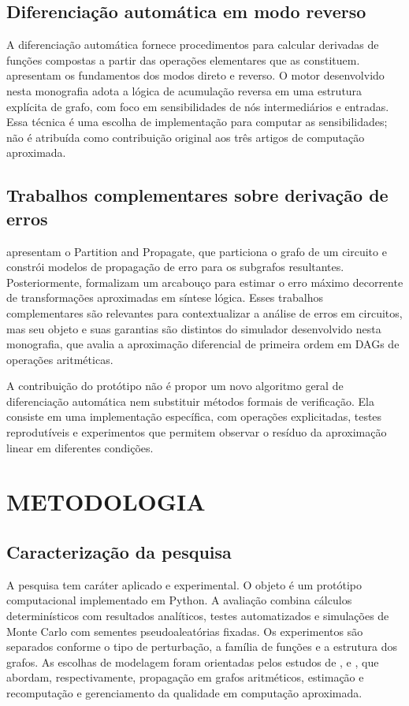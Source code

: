 \documentclass[12pt,openright,oneside,a4paper,brazil]{abntex2}
\begin{document}
\section{Diferenciação automática em modo reverso}
A diferenciação automática fornece procedimentos para calcular derivadas de funções compostas a partir das operações elementares que as constituem.  apresentam os fundamentos dos modos direto e reverso. O motor desenvolvido nesta monografia adota a lógica de acumulação reversa em uma estrutura explícita de grafo, com foco em sensibilidades de nós intermediários e entradas. Essa técnica é uma escolha de implementação para computar as sensibilidades; não é atribuída como contribuição original aos três artigos de computação aproximada.

\section{Trabalhos complementares sobre derivação de erros}
 apresentam o Partition and Propagate, que particiona o grafo de um circuito e constrói modelos de propagação de erro para os subgrafos resultantes. Posteriormente,  formalizam um arcabouço para estimar o erro máximo decorrente de transformações aproximadas em síntese lógica. Esses trabalhos complementares são relevantes para contextualizar a análise de erros em circuitos, mas seu objeto e suas garantias são distintos do simulador desenvolvido nesta monografia, que avalia a aproximação diferencial de primeira ordem em DAGs de operações aritméticas.

A contribuição do protótipo não é propor um novo algoritmo geral de diferenciação automática nem substituir métodos formais de verificação. Ela consiste em uma implementação específica, com operações explicitadas, testes reprodutíveis e experimentos que permitem observar o resíduo da aproximação linear em diferentes condições.

\chapter{METODOLOGIA}

\section{Caracterização da pesquisa}
A pesquisa tem caráter aplicado e experimental. O objeto é um protótipo computacional implementado em Python. A avaliação combina cálculos determinísticos com resultados analíticos, testes automatizados e simulações de Monte Carlo com sementes pseudoaleatórias fixadas. Os experimentos são separados conforme o tipo de perturbação, a família de funções e a estrutura dos grafos. As escolhas de modelagem foram orientadas pelos estudos de ,  e , que abordam, respectivamente, propagação em grafos aritméticos, estimação e recomputação e gerenciamento da qualidade em computação aproximada.
\end{document}
